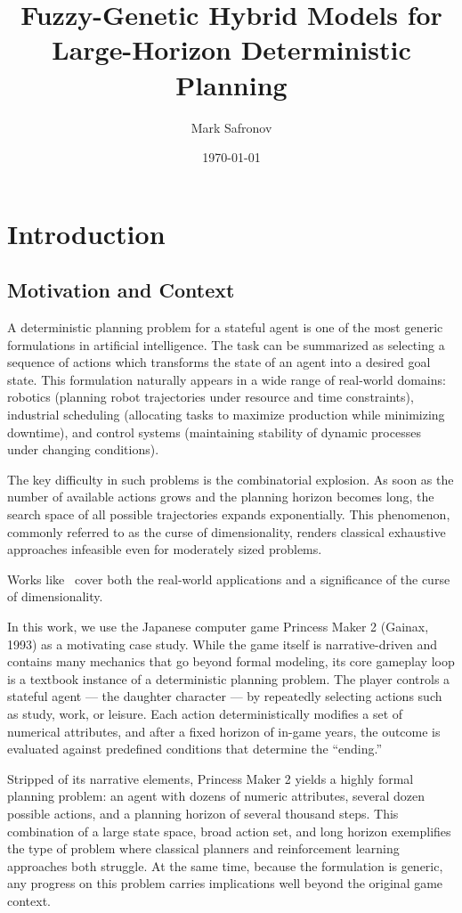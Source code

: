\documentclass[12pt, a4paper]{report}
\title{Fuzzy-Genetic Hybrid Models for Large-Horizon Deterministic Planning}
\author{Mark Safronov}
\date{\today}
\begin{document}
	
	
	
	\tableofcontents
	
	\chapter{Introduction}
	
	\section{Motivation and Context}
	
	A deterministic planning problem for a stateful agent is one of the most generic formulations in artificial intelligence. 
	The task can be summarized as selecting a sequence of actions which transforms the state of an agent into a desired goal state. 
	This formulation naturally appears in a wide range of real-world domains: robotics (planning robot trajectories under resource and time constraints), industrial scheduling (allocating tasks to maximize production while minimizing downtime), and control systems (maintaining stability of dynamic processes under changing conditions).
	
	The key difficulty in such problems is the combinatorial explosion. 
	As soon as the number of available actions grows and the planning horizon becomes long, the search space of all possible trajectories expands exponentially. 
	This phenomenon, commonly referred to as the curse of dimensionality, renders classical exhaustive approaches infeasible even for moderately sized problems.
	
	Works like~\cite{WOS:001308319900003} cover both the real-world applications and a significance of the curse of dimensionality.
	
	In this work, we use the Japanese computer game Princess Maker 2 (Gainax, 1993) as a motivating case study. 
	While the game itself is narrative-driven and contains many mechanics that go beyond formal modeling, its core gameplay loop is a textbook instance of a deterministic planning problem. 
	The player controls a stateful agent — the daughter character — by repeatedly selecting actions such as study, work, or leisure. 
	Each action deterministically modifies a set of numerical attributes, and after a fixed horizon of in-game years, the outcome is evaluated against predefined conditions that determine the “ending.”
	
	Stripped of its narrative elements, Princess Maker 2 yields a highly formal planning problem: an agent with dozens of numeric attributes, several dozen possible actions, and a planning horizon of several thousand steps. 
	This combination of a large state space, broad action set, and long horizon exemplifies the type of problem where classical planners and reinforcement learning approaches both struggle. 
	At the same time, because the formulation is generic, any progress on this problem carries implications well beyond the original game context.
	
\end{document}
